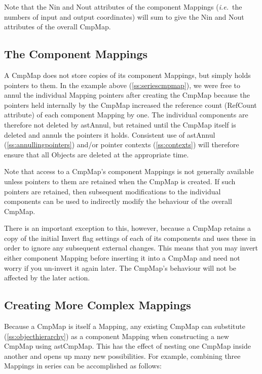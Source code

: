 \documentclass[twoside,11pt]{article}
\newcommand{\htmlref}[2]{#1}
\newcommand{\secref}[1]{\S\ref{#1}}
\renewcommand{\secref}[1]{\ref{#1}}
\begin{document}
Note that the \htmlref{Nin}{Nin} and \htmlref{Nout}{Nout} attributes of the component Mappings
({\em{i.e.}}\ the numbers of input and output coordinates) will sum to
give the Nin and Nout attributes of the overall CmpMap.

\subsection{\label{ss:cmpmapcomponents}The Component Mappings}

A \htmlref{CmpMap}{CmpMap} does not store copies of its component Mappings, but simply
holds pointers to them. In the example above
(\secref{ss:seriescmpmap}), we were free to annul the individual
\htmlref{Mapping}{Mapping} pointers after creating the CmpMap because the pointers held
internally by the CmpMap increased the reference count (\htmlref{RefCount}{RefCount}
attribute) of each component Mapping by one. The individual components
are therefore not deleted by \htmlref{astAnnul}{astAnnul}, but retained until the CmpMap
itself is deleted and annuls the pointers it holds. Consistent use of
astAnnul (\secref{ss:annullingpointers}) and/or pointer contexts
(\secref{ss:contexts}) will therefore ensure that all Objects are
deleted at the appropriate time.

Note that access to a CmpMap's component Mappings is not generally
available unless pointers to them are retained when the CmpMap is
created. If such pointers are retained, then subsequent modifications
to the individual components can be used to indirectly modify the
behaviour of the overall CmpMap.

There is an important exception to this, however, because a CmpMap
retains a copy of the initial \htmlref{Invert}{Invert} flag settings of each of its
components and uses these in order to ignore any subsequent external
changes. This means that you may invert either component Mapping
before inserting it into a CmpMap and need not worry if you un-invert
it again later. The CmpMap's behaviour will not be affected by the
later action.

\subsection{\label{ss:complexcmpmap}Creating More Complex Mappings}

Because a \htmlref{CmpMap}{CmpMap} is itself a \htmlref{Mapping}{Mapping}, any existing CmpMap can
substitute (\secref{ss:objecthierarchy}) as a component Mapping when
constructing a new CmpMap using \htmlref{astCmpMap}{astCmpMap}. This has the effect of
nesting one CmpMap inside another and opens up many new possibilities.
For example, combining three Mappings in series can be accomplished as
follows:
\end{document}
